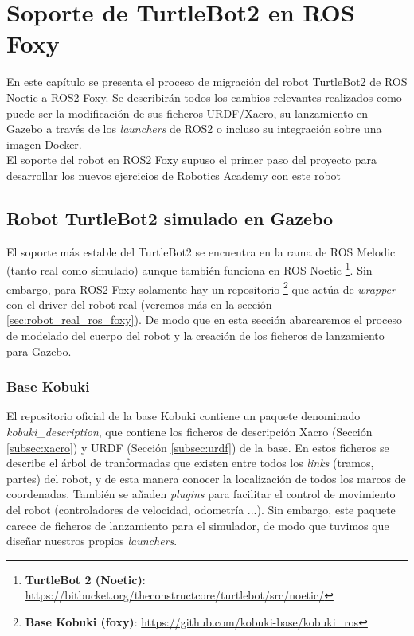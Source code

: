 \chapter{Soporte de TurtleBot2 en ROS Foxy}
\label{cap:capitulo4}

En este capítulo se presenta el proceso de migración del robot TurtleBot2 de ROS Noetic a ROS2 Foxy. Se describirán todos los cambios relevantes realizados como puede ser la modificación de sus ficheros URDF/Xacro, su lanzamiento en Gazebo a través de los \textit{launchers} de ROS2 o incluso su integración sobre una imagen Docker.\\

El soporte del robot en ROS2 Foxy supuso el primer paso del proyecto para desarrollar los nuevos ejercicios de Robotics Academy con este robot\\




\section{Robot TurtleBot2 simulado en Gazebo}
\label{sec:robot_simulado_gazebo}
El soporte más estable del TurtleBot2 se encuentra en la rama de ROS Melodic (tanto real como simulado) aunque también funciona en ROS Noetic \footnote{\textbf{TurtleBot 2 (Noetic)}: \url{https://bitbucket.org/theconstructcore/turtlebot/src/noetic/}}. Sin embargo, para ROS2 Foxy solamente hay un repositorio \footnote{\textbf{Base Kobuki (foxy)}: \url{https://github.com/kobuki-base/kobuki_ros}} que actúa de \textit{wrapper} con el driver del robot real (veremos más en la sección \ref{sec:robot_real_ros_foxy}). De modo que en esta sección abarcaremos el proceso de modelado del cuerpo del robot y la creación de los ficheros de lanzamiento para Gazebo.\\


\subsection{Base Kobuki}
\label{subsec:kobuki_base_simulado}

El repositorio oficial de la base Kobuki contiene un paquete denominado \textit{kobuki\_description}, que contiene los ficheros de descripción Xacro (Sección \ref{subsec:xacro}) y URDF (Sección \ref{subsec:urdf}) de la base. En estos ficheros se describe el árbol de tranformadas que existen entre todos los \textit{links} (tramos, partes) del robot, y de esta manera conocer la localización de todos los marcos de coordenadas. También se añaden \textit{plugins} para facilitar el control de movimiento del robot (controladores de velocidad, odometría ...). Sin embargo, este paquete carece de ficheros de lanzamiento para el simulador, de modo que tuvimos que diseñar nuestros propios \textit{launchers}.\\

